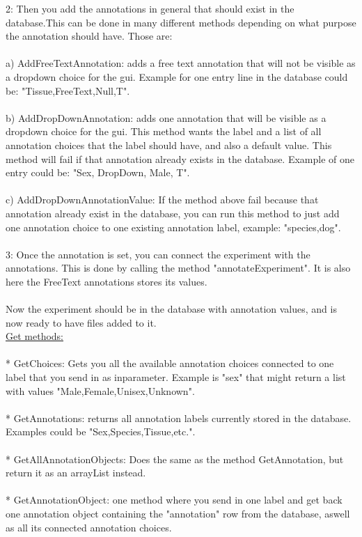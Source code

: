 2: Then you add the annotations in general that should exist in the database.This can be done in many different methods depending on what purpose the annotation should have. Those are:\\
\\
a) AddFreeTextAnnotation: adds a free text annotation that will not be visible as a dropdown choice for the gui. Example for one entry line in the database could be: "Tissue,FreeText,Null,T".\\
\\
b) AddDropDownAnnotation: adds one annotation that will be visible as a dropdown choice for the gui. This method wants the label and a list of all annotation choices that the label should have, and also a default value. This method will fail if that annotation already exists in the database. Example of one entry could be: "Sex, DropDown, Male, T".\\
\\
c) AddDropDownAnnotationValue: If the method above fail because that annotation already exist in the database, you can run this method to just add one annotation choice to one existing annotation label, example: "species,dog".\\
\\
3: Once the annotation is set, you can connect the experiment with the annotations. This is done by calling the method "annotateExperiment". It is also here the FreeText annotations stores its values.\\
\\
Now the experiment should be in the database with annotation values, and is now ready to have files added to it.\\
\newpage
\underline{Get methods:}\\
\\
* GetChoices: Gets you all the available annotation choices connected to one label that you send in as inparameter. Example is "sex" that might return a list with values "Male,Female,Unisex,Unknown".\\
\\
* GetAnnotations: returns all annotation labels currently stored in the database. Examples could be "Sex,Species,Tissue,etc.".\\
\\
* GetAllAnnotationObjects: Does the same as the method GetAnnotation, but return it as an arrayList instead.\\
\\
* GetAnnotationObject: one method where you send in one label and get back one annotation object containing the "annotation" row  from the database, aswell as all its connected annotation choices.\\
